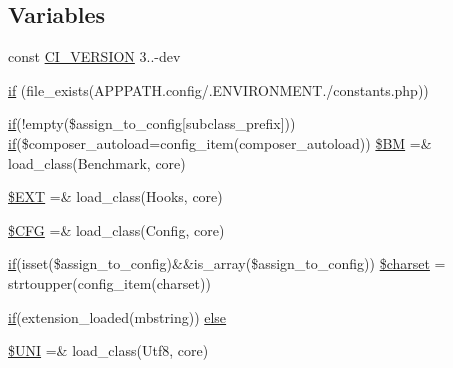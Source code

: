 \subsection*{Variables}
\begin{DoxyCompactItemize}
\item 
const \hyperlink{_code_igniter_8php_a32e3c3927ba8ec93df92327dfd85d564}{C\+I\+\_\+\+V\+E\+R\+S\+I\+O\+N} \textquotesingle{}3..-\/dev\textquotesingle{}
\item 
\hyperlink{_code_igniter_8php_a6503a8f8da73cafe64ad07639c198f54}{if} (file\+\_\+exists(A\+P\+P\+P\+A\+T\+H.\textquotesingle{}config/\textquotesingle{}.E\+N\+V\+I\+R\+O\+N\+M\+E\+N\+T.\textquotesingle{}/constants.\+php\textquotesingle{}))
\item 
\hyperlink{excanvas_8js_a409038cddd5fb941140f7ff76f5b7b15}{if}(!empty(\$assign\+\_\+to\+\_\+config\mbox{[}\textquotesingle{}subclass\+\_\+prefix\textquotesingle{}\mbox{]})) \hyperlink{excanvas_8js_a409038cddd5fb941140f7ff76f5b7b15}{if}(\$composer\+\_\+autoload=config\+\_\+item(\textquotesingle{}composer\+\_\+autoload\textquotesingle{})) \hyperlink{_code_igniter_8php_a3efe5c22835162259cd530154490ade3}{\$\+B\+M} =\& load\+\_\+class(\textquotesingle{}Benchmark\textquotesingle{}, \textquotesingle{}core\textquotesingle{})
\item 
\hyperlink{_code_igniter_8php_ab97aae9bc0aae04b84d360a29a3c035b}{\$\+E\+X\+T} =\& load\+\_\+class(\textquotesingle{}Hooks\textquotesingle{}, \textquotesingle{}core\textquotesingle{})
\item 
\hyperlink{_code_igniter_8php_adb9373e11e42b2cd55d1fe249ae72deb}{\$\+C\+F\+G} =\& load\+\_\+class(\textquotesingle{}Config\textquotesingle{}, \textquotesingle{}core\textquotesingle{})
\item 
\hyperlink{excanvas_8js_a409038cddd5fb941140f7ff76f5b7b15}{if}(isset(\$assign\+\_\+to\+\_\+config)\&\&is\+\_\+array(\$assign\+\_\+to\+\_\+config)) \hyperlink{_code_igniter_8php_acf3a97185c56fefd63af2d2af8676bd9}{\$charset} = strtoupper(config\+\_\+item(\textquotesingle{}charset\textquotesingle{}))
\item 
\hyperlink{excanvas_8js_a409038cddd5fb941140f7ff76f5b7b15}{if}(extension\+\_\+loaded(\textquotesingle{}mbstring\textquotesingle{})) \hyperlink{_code_igniter_8php_ac5109000d551293e102a2bc06f29cda4}{else}
\item 
\hyperlink{_code_igniter_8php_a2060dabd8d00b5b0539bd041bf450924}{\$\+U\+N\+I} =\& load\+\_\+class(\textquotesingle{}Utf8\textquotesingle{}, \textquotesingle{}core\textquotesingle{})
\item 

\end{DoxyCompactItemize}

